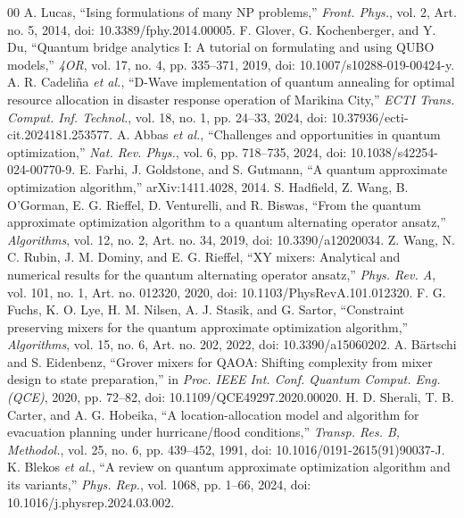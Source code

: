 \documentclass[conference]{IEEEtran}
\begin{document}
\balance
\begin{thebibliography}{00}
 A. Lucas, ``Ising formulations of many NP problems,'' \textit{Front. Phys.}, vol. 2, Art. no. 5, 2014, doi: 10.3389/fphy.2014.00005.
 F. Glover, G. Kochenberger, and Y. Du, ``Quantum bridge analytics I: A tutorial on formulating and using QUBO models,'' \textit{4OR}, vol. 17, no. 4, pp. 335--371, 2019, doi: 10.1007/s10288-019-00424-y.
 A. R. Cadeli\~{n}a \textit{et al.}, ``D-Wave implementation of quantum annealing for optimal resource allocation in disaster response operation of Marikina City,'' \textit{ECTI Trans. Comput. Inf. Technol.}, vol. 18, no. 1, pp. 24--33, 2024, doi: 10.37936/ecti-cit.2024181.253577.
 A. Abbas \textit{et al.}, ``Challenges and opportunities in quantum optimization,'' \textit{Nat. Rev. Phys.}, vol. 6, pp. 718--735, 2024, doi: 10.1038/s42254-024-00770-9.
 E. Farhi, J. Goldstone, and S. Gutmann, ``A quantum approximate optimization algorithm,'' arXiv:1411.4028, 2014.
 S. Hadfield, Z. Wang, B. O'Gorman, E. G. Rieffel, D. Venturelli, and R. Biswas, ``From the quantum approximate optimization algorithm to a quantum alternating operator ansatz,'' \textit{Algorithms}, vol. 12, no. 2, Art. no. 34, 2019, doi: 10.3390/a12020034.
 Z. Wang, N. C. Rubin, J. M. Dominy, and E. G. Rieffel, ``XY mixers: Analytical and numerical results for the quantum alternating operator ansatz,'' \textit{Phys. Rev. A}, vol. 101, no. 1, Art. no. 012320, 2020, doi: 10.1103/PhysRevA.101.012320.
 F. G. Fuchs, K. O. Lye, H. M. Nilsen, A. J. Stasik, and G. Sartor, ``Constraint preserving mixers for the quantum approximate optimization algorithm,'' \textit{Algorithms}, vol. 15, no. 6, Art. no. 202, 2022, doi: 10.3390/a15060202.
 A. B\"{a}rtschi and S. Eidenbenz, ``Grover mixers for QAOA: Shifting complexity from mixer design to state preparation,'' in \textit{Proc. IEEE Int. Conf. Quantum Comput. Eng. (QCE)}, 2020, pp. 72--82, doi: 10.1109/QCE49297.2020.00020.
 H. D. Sherali, T. B. Carter, and A. G. Hobeika, ``A location-allocation model and algorithm for evacuation planning under hurricane/flood conditions,'' \textit{Transp. Res. B, Methodol.}, vol. 25, no. 6, pp. 439--452, 1991, doi: 10.1016/0191-2615(91)90037-J.
 K. Blekos \textit{et al.}, ``A review on quantum approximate optimization algorithm and its variants,'' \textit{Phys. Rep.}, vol. 1068, pp. 1--66, 2024, doi: 10.1016/j.physrep.2024.03.002.

\end{thebibliography}
\end{document}
